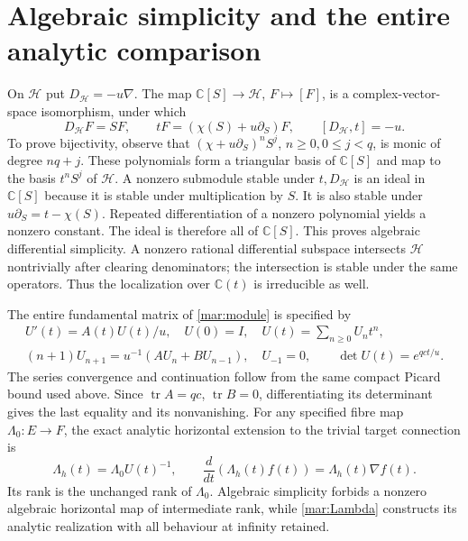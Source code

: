 \documentclass[11pt]{article}
\newcommand{\CC}{\mathbb C}
\newcommand{\tr}{\operatorname{tr}}
\begin{document}
\section{Algebraic simplicity and the entire analytic comparison}
On $\mathscr H$ put $D_{\mathscr H}=-u\nabla$. The map
$\CC[S]\to\mathscr H$, $F\mapsto[F]$, is a complex-vector-space
isomorphism, under which
\begin{equation}\tag{MAR17}\label{mar:weyl}
 D_{\mathscr H}F=SF,\qquad
 tF=(\chi(S)+u\partial_S)F,
 \qquad[D_{\mathscr H},t]=-u.
\end{equation}
To prove bijectivity, observe that
$(\chi+u\partial_S)^nS^j$, $n\ge0,0\le j<q$, is monic of degree
$nq+j$. These polynomials form a triangular basis of $\CC[S]$
and map to the basis $t^nS^j$ of $\mathscr H$.
A nonzero submodule stable under $t,D_{\mathscr H}$ is an ideal
in $\CC[S]$ because it is stable under multiplication by $S$.
It is also stable under $u\partial_S=t-\chi(S)$.
Repeated differentiation of a nonzero polynomial yields a nonzero
constant. The ideal is therefore all of $\CC[S]$. This proves
algebraic differential simplicity. A nonzero rational differential
subspace intersects $\mathscr H$ nontrivially after clearing
denominators; the intersection is stable under the same operators.
Thus the localization over $\CC(t)$ is irreducible as well.

The entire fundamental matrix of \eqref{mar:module} is specified by
\begin{equation}\tag{MAR18}\label{mar:U}
 \begin{gathered}
 U'(t)=A(t)U(t)/u,\quad U(0)=I,\quad
 U(t)=\sum_{n\ge0}U_nt^n,\\
 (n+1)U_{n+1}=u^{-1}(AU_n+BU_{n-1}),\quad U_{-1}=0,
 \qquad\det U(t)=e^{qct/u}.
 \end{gathered}
\end{equation}
The series convergence and continuation follow from the same compact
Picard bound used above. Since $\tr A=qc$, $\tr B=0$, differentiating
its determinant gives the last equality and its nonvanishing.
For any specified fibre map $\Lambda_0:E\to F$, the exact analytic
horizontal extension to the trivial target connection is
\begin{equation}\tag{MAR19}\label{mar:Lambda}
 \Lambda_h(t)=\Lambda_0U(t)^{-1},\qquad
 \frac{d}{dt}(\Lambda_h(t)f(t))=\Lambda_h(t)\nabla f(t).
\end{equation}
Its rank is the unchanged rank of $\Lambda_0$. Algebraic simplicity
forbids a nonzero algebraic horizontal map of intermediate rank,
while \eqref{mar:Lambda} constructs its analytic realization with
all behaviour at infinity retained.
\end{document}
